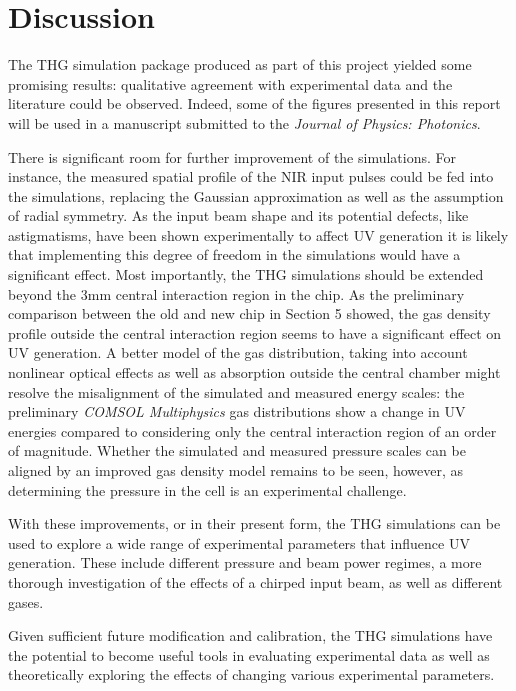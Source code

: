 \documentclass[a4paper]{jpconf}
\begin{document}
\section{Discussion}

The THG simulation package produced as part of this project yielded some promising results: qualitative agreement with experimental data and the literature could be observed. Indeed, some of the figures presented in this report will be used in a manuscript submitted to the \textit{Journal of Physics: Photonics}. \par 
There is significant room for further improvement of the simulations. For instance, the measured spatial profile of the NIR input pulses could be fed into the simulations, replacing the Gaussian approximation as well as the assumption of radial symmetry. As the input beam shape and its potential defects, like astigmatisms, have been shown experimentally to affect UV generation it is likely that implementing this degree of freedom in the simulations would have a significant effect. Most importantly, the THG simulations should be extended beyond the 3mm central interaction region in the chip. As the preliminary comparison between the old and new chip in Section 5 showed, the gas density profile outside the central interaction region seems to have a significant effect on UV generation.  A better model of the gas distribution, taking into account nonlinear optical effects as well as absorption outside the central chamber might resolve the misalignment of the simulated and measured energy scales: the preliminary \textit{COMSOL Multiphysics} gas distributions show a change in UV energies compared to considering only the central interaction region of an order of magnitude. Whether the simulated and measured pressure scales can be aligned by an improved gas density model remains to be seen, however, as determining the pressure in the cell is an experimental challenge. \par 
With these improvements, or in their present form, the THG simulations can be used to explore a wide range of experimental parameters that influence UV generation. These include different pressure and beam power regimes, a more thorough investigation of the effects of a chirped input beam, as well as different gases. \par 
Given sufficient future modification and calibration, the THG simulations have the potential to become useful tools in evaluating experimental data as well as theoretically exploring the effects of changing various experimental parameters.  
\end{document}
